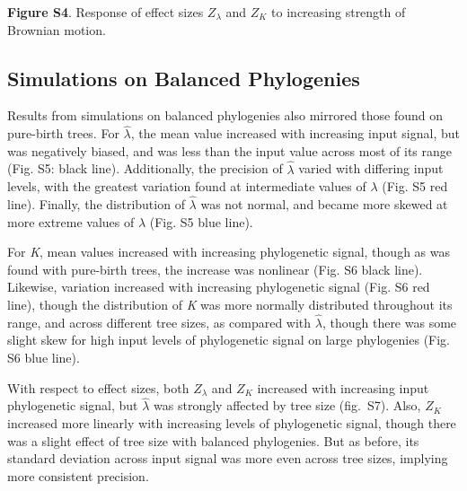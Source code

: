 \documentclass[
]{article}
\begin{document}
\textbf{Figure S4}. Response of effect sizes \(Z_{\lambda}\) and \(Z_K\)
to increasing strength of Brownian motion.

\newpage

\hypertarget{simulations-on-balanced-phylogenies}{%
\subsection{Simulations on Balanced
Phylogenies}\label{simulations-on-balanced-phylogenies}}

Results from simulations on balanced phylogenies also mirrored those
found on pure-birth trees. For \(\hat{\lambda}\), the mean value
increased with increasing input signal, but was negatively biased, and
was less than the input value across most of its range (Fig. S5: black
line). Additionally, the precision of \(\hat{\lambda}\) varied with
differing input levels, with the greatest variation found at
intermediate values of \(\lambda\) (Fig. S5 red line). Finally, the
distribution of \(\hat{\lambda}\) was not normal, and became more skewed
at more extreme values of \(\lambda\) (Fig. S5 blue line). \hfill\break

For \emph{K}, mean values increased with increasing phylogenetic signal,
though as was found with pure-birth trees, the increase was nonlinear
(Fig. S6 black line). Likewise, variation increased with increasing
phylogenetic signal (Fig. S6 red line), though the distribution of
\emph{K} was more normally distributed throughout its range, and across
different tree sizes, as compared with \(\hat{\lambda}\), though there
was some slight skew for high input levels of phylogenetic signal on
large phylogenies (Fig. S6 blue line). \hfill\break

With respect to effect sizes, both \(Z_{\lambda}\) and \(Z_K\) increased
with increasing input phylogenetic signal, but \(\hat{\lambda}\) was
strongly affected by tree size (fig.~S7). Also, \(Z_K\) increased more
linearly with increasing levels of phylogenetic signal, though there was
a slight effect of tree size with balanced phylogenies. But as before,
its standard deviation across input signal was more even across tree
sizes, implying more consistent precision.
\end{document}
